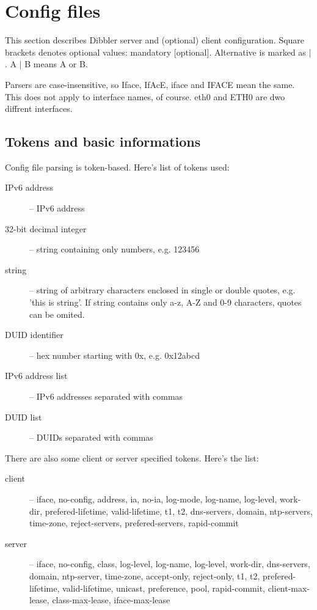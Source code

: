 

\section{Config files}

This section describes Dibbler server and (optional) client
configuration. Square brackets denotes optional values: mandatory
[optional]. Alternative is marked as $\mid$. A $\mid$ B means A or B.

Parsers are case-insensitive, so Iface, IfAcE, iface and IFACE mean the
same. This does not apply to interface names, of course. eth0 and ETH0
are dwo diffrent interfaces.

\subsection{Tokens and basic informations}
Config file parsing is token-based. Here's list of tokens used:
\begin{description}
\item[IPv6 address] -- IPv6 address 
\item[32-bit decimal integer] -- string containing only numbers, e.g. 123456
\item[string] -- string of arbitrary characters enclosed in single or double
  quotes, e.g. 'this is string'. If string contains only a-z, A-Z and
  0-9 characters, quotes can be omited.
\item[DUID identifier] -- hex number starting with 0x, e.g. 0x12abcd
\item[IPv6 address list] -- IPv6 addresses separated with commas
\item[DUID list] -- DUIDs separated with commas
\end{description}

There are also some client or server specified tokens. Here's the list:
\begin{description}
\item[client] -- iface, no-config, address, ia, no-ia,
log-mode, log-name, log-level, work-dir, prefered-lifetime, valid-lifetime,
t1, t2, dns-servers, domain, ntp-servers, time-zone, reject-servers,
prefered-servers, rapid-commit 
\item[server] -- iface, no-config, class, log-level, log-name,
  log-level, work-dir, dns-servers, domain, ntp-server, time-zone, accept-only,
  reject-only, t1, t2, prefered-lifetime, valid-lifetime, unicast,
  preference, pool, rapid-commit, client-max-lease, class-max-lease,
  iface-max-lease
\end{description}

